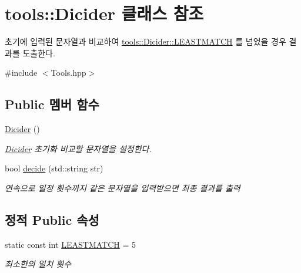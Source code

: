 \hypertarget{classtools_1_1_dicider}{}\section{tools\+:\+:Dicider 클래스 참조}
\label{classtools_1_1_dicider}


초기에 입력된 문자열과 비교하여 \hyperlink{classtools_1_1_dicider_afdc1fb561a2ed8037d0fa87b69a7792d}{tools\+::\+Dicider\+::\+L\+E\+A\+S\+T\+M\+A\+T\+CH} 를 넘었을 경우 결과를 도출한다.  




{\ttfamily \#include $<$Tools.\+hpp$>$}

\subsection*{Public 멤버 함수}
\begin{DoxyCompactItemize}
\item 
\mbox{\label{classtools_1_1_dicider_a8648682b1eba05db80a14051fc0b16c6}} 
\hyperlink{classtools_1_1_dicider_a8648682b1eba05db80a14051fc0b16c6}{Dicider} ()
\begin{DoxyCompactList}\small\item\em \hyperlink{classtools_1_1_dicider}{Dicider} 초기화 비교할 문자열을 설정한다. \end{DoxyCompactList}\item 
bool \hyperlink{classtools_1_1_dicider_a7340ce8845ca163e4bcddd73be54a0c9}{decide} (std\+::string str)
\begin{DoxyCompactList}\small\item\em 연속으로 일정 횟수까지 같은 문자열을 입력받으면 최종 결과를 출력 \end{DoxyCompactList}\end{DoxyCompactItemize}
\subsection*{정적 Public 속성}
\begin{DoxyCompactItemize}
\item 
\mbox{\label{classtools_1_1_dicider_afdc1fb561a2ed8037d0fa87b69a7792d}} 
static const int \hyperlink{classtools_1_1_dicider_afdc1fb561a2ed8037d0fa87b69a7792d}{L\+E\+A\+S\+T\+M\+A\+T\+CH} = 5
\begin{DoxyCompactList}\small\item\em 최소한의 일치 횟수 \end{DoxyCompactList}\end{DoxyCompactItemize}

